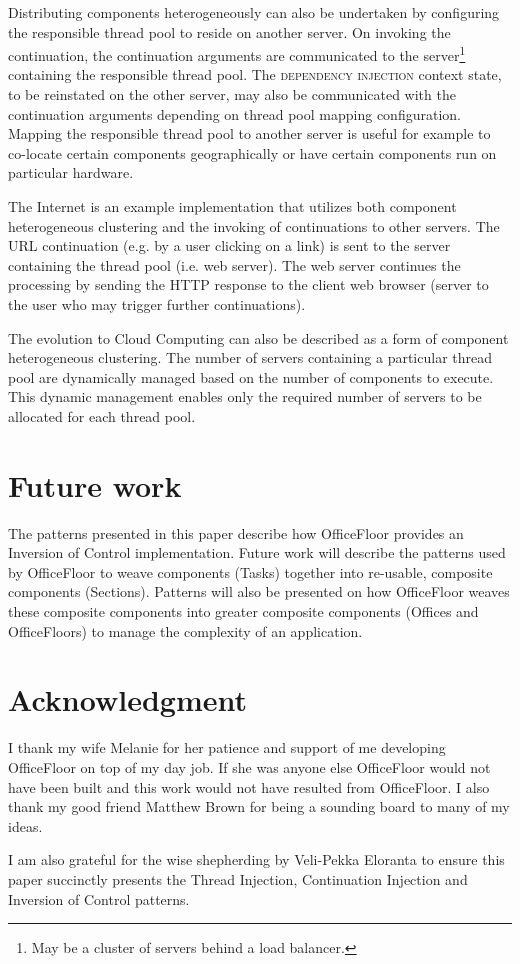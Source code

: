 \documentclass[prodmode]{style/acmlarge}
\begin{document}
Distributing components heterogeneously can also be undertaken by configuring
the responsible thread pool to reside on another server.  On invoking the
continuation, the continuation arguments are communicated to the
server\footnote{May be a cluster of servers behind a load balancer.} containing
the responsible thread pool.  The \textsc{dependency injection} context state,
to be reinstated on the other server, may also be communicated with the
continuation arguments depending on thread pool mapping configuration.  Mapping
the responsible thread pool to another server is useful for example to co-locate
certain components geographically or have certain components run on particular
hardware.

The Internet is an example implementation that utilizes both component
heterogeneous clustering and the invoking of continuations to other servers. 
The URL continuation (e.g. by a user clicking on a link) is sent to the server
containing the thread pool (i.e. web server).  The web server continues the
processing by sending the HTTP response to the client web browser (server to the
user who may trigger further continuations).

The evolution to Cloud Computing can also be described as a form of component
heterogeneous clustering.  The number of servers containing a particular thread
pool are dynamically managed based on the number of components to execute.  This
dynamic management enables only the required number of servers to be allocated
for each thread pool.



\section{Future work}

The patterns presented in this paper describe how OfficeFloor \cite{officefloor}
provides an Inversion of Control implementation.  Future work will describe the
patterns used by OfficeFloor to weave components (Tasks) together into
re-usable, composite components (Sections).  Patterns will also be presented on
how OfficeFloor weaves these composite components into greater composite
components (Offices and OfficeFloors) to manage the complexity of an
application.



\section*{Acknowledgment} I thank my wife Melanie for her patience and support
of me developing OfficeFloor on top of my day job.  If she was anyone else
OfficeFloor would not have been built and this work would not have resulted from
OfficeFloor.  I also thank my good friend Matthew Brown for being a sounding
board to many of my ideas.

I am also grateful for the wise shepherding by Veli-Pekka Eloranta to ensure
this paper succinctly presents the Thread Injection, Continuation Injection and
Inversion of Control patterns.




\end{document}
